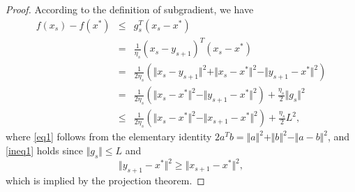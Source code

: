 \begin{proof}
	According to the definition of subgradient, we have
	\begin{eqnarray}
			f(x_s)-f(x^*)&\le& g_s^T(x_s-x^*) \nonumber \\
			&=& \frac{1}{\eta_s}(x_s-y_{s+1})^T(x_s-x^*) \nonumber\\
			&=& \frac{1}{2\eta_s}(\Vert x_s-y_{s+1} \Vert^2+\Vert x_s-x^* \Vert^2-\Vert y_{s+1}-x^* \Vert^2)\label{eq1}\\
			&=& \frac{1}{2\eta_s}(\Vert x_s-x^* \Vert^2-\Vert y_{s+1}-x^* \Vert^2)+\frac{\eta_s}{2}\Vert g_s \Vert^2 \nonumber\\
&\le& \frac{1}{2\eta_s}(\Vert x_s-x^* \Vert^2-\Vert x_{s+1}-x^* \Vert^2)+\frac{\eta_s}{2}L^2,\label{ineq1}
	\end{eqnarray}
where \eqref{eq1} follows from the elementary identity $2a^Tb=\Vert a\Vert^2+\Vert b\Vert^2-\Vert a-b\Vert^2$, and \eqref{ineq1} holds since $\Vert g_s \Vert \le L$ and
	\begin{equation*}
		\Vert y_{s+1}-x^* \Vert^2\ge \Vert x_{s+1}-x^* \Vert^2,
	\end{equation*}
which is implied by  the projection theorem.


\end{proof}
